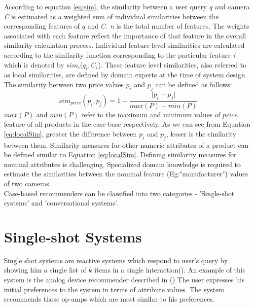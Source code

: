 According to equation \ref{eq:sim}, the similarity between a user query \textit{q} and camera \textit{C} is estimated 
as a weighted sum of individual similarities between the corresponding features of $q$ and $C$. 
\textit{n} is the total number of features.
The weights associated with each feature reflect the importance of that feature in the overall similarity calculation process. 
Individual feature level similarities are calculated according to the similarity function corresponding to the particular feature \textit{i} which is denoted by $sim_i$($q_i, C_i$).
These feature level similarities, also referred to as local similarities, are defined by domain experts at the time of system design.
The similarity between two price values $p_i$ and $p_j$ can be defined as follows:
\begin{equation}
\label{eq:localSim}
sim_{price}(p_i, p_j) = 1 - \frac{\lvert p_i - p_j \rvert}{max(P) - min(P)}
\end{equation}
$max(P)$ and $min(P)$ refer to the maximum and minimum values of $price$ feature of all products in the case-base respectively.
As we can see from Equation \ref{eq:localSim}, greater the difference between $p_i$ and $p_j$, lesser is the similarity between them.
Similarity measures for other numeric attributes of a product can be defined similar to Equation \ref{eq:localSim}.
Defining similarity measures for nominal attributes is challenging.
Specialized domain knowledge is required to estimate the similarities between the nominal feature (Eg:"manufacturer") values of two cameras.\\
Case-based recommenders can be classified into two categories - 'Single-shot systems' and 'conversational systems'.


\section{Single-shot Systems}
Single shot systems are reactive systems which respond to user's query by showing him a single list of $k$ items in a single interaction(\cite{smyth2007}).
An example of this system is the analog device recommender described in (\cite{wilke98}) 
The user expresses his initial preferences to the system in terms of attribute values.
The system recommends those op-amps which are most similar to his preferences. 

